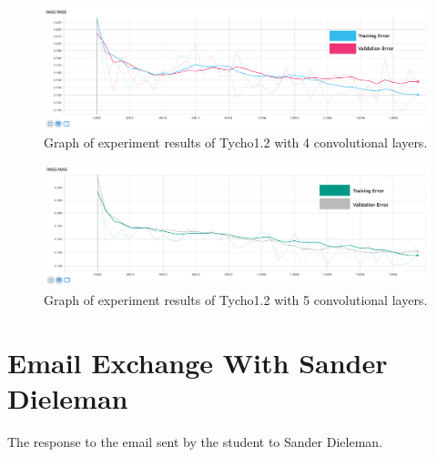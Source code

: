 \documentclass[12pt,a4paper,oneside,oldfontcommands]{memoir}
\begin{document}
\begin{Declaration Of OriginalityOrginality}
\begin{figure}[H]
  \centering
    \includegraphics[width=\linewidth]{graphs/F/conv4.png}
    \caption{Graph of experiment results of Tycho1.2 with 4 convolutional layers.}
\end{figure}


\begin{figure}[H]
  \centering
    \includegraphics[width=\linewidth]{graphs/F/conv5.png}
    \caption{Graph of experiment results of Tycho1.2 with 5 convolutional layers.}
\end{figure}



\chapter{Email Exchange With Sander Dieleman}

The response to the email sent by the student to Sander Dieleman.


\end{Declaration Of OriginalityOrginality}
\end{document}
